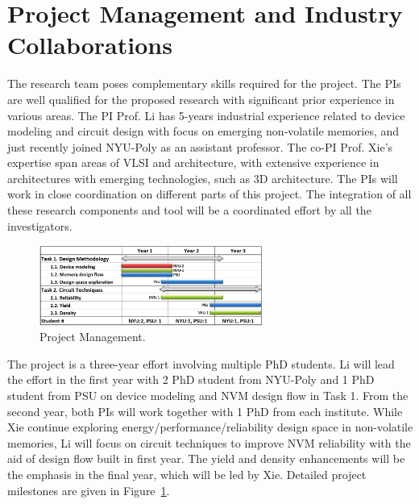 
\section{Project Management and Industry Collaborations}
%

The research team poses complementary skills required for the project. The PIs are well qualified for the proposed research with significant prior experience in various areas. The PI Prof. Li has 5-years industrial experience related to device modeling and circuit design with focus on emerging non-volatile memories, and just recently joined NYU-Poly as an assistant professor. The co-PI Prof. Xie's expertise span areas of VLSI and architecture, with extensive experience in architectures with emerging technologies, such as 3D architecture. The PIs will work in close coordination on different parts of this project. The integration of all these research components and tool will be a coordinated effort by all the investigators.


\begin{figure}
\includegraphics[width=0.65\textwidth]{./figure/schedule.pdf}
\vspace{-20pt} \caption{Project Management.}
\label{fig:plan} \vspace{-10pt}
\end{figure}

The project is a three-year effort involving multiple PhD students. Li will lead the effort in the first year with 2 PhD student from NYU-Poly and 1 PhD student from PSU on device modeling and NVM design flow in Task 1. From the second year, both PIs will work together with 1 PhD from each institute. While Xie continue exploring energy/performance/reliability design space in non-volatile memories, Li will focus on circuit techniques to improve NVM reliability with the aid of design flow built in first year. The yield and density enhancements will be the emphasis in the final year, which will be led by Xie. Detailed project milestones are given in Figure~\ref{fig:plan}.

